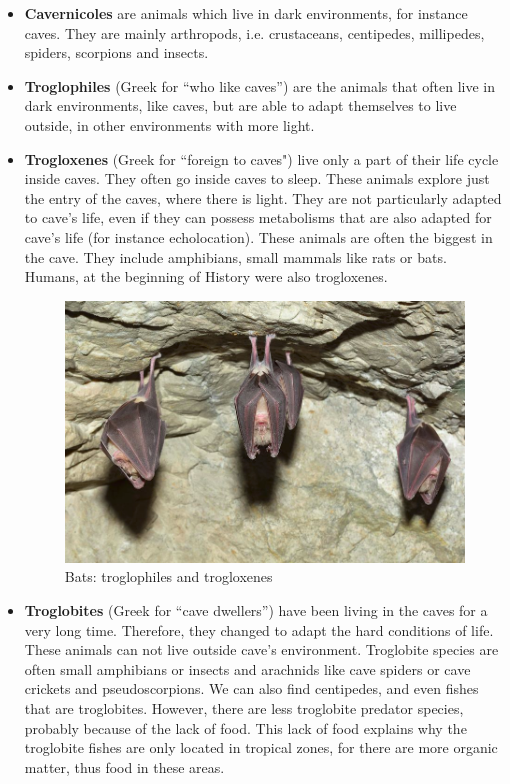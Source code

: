\documentclass[draft, final]{report}
\begin{document}
\begin{itemize}

\item \textbf{Cavernicoles} are animals which live in dark environments, for instance caves. They are mainly arthropods, i.e. crustaceans, centipedes, millipedes, spiders, scorpions and insects.

\item \textbf{Troglophiles} (Greek for “who like caves”) are the animals that often live in dark environments, like caves, but are able to adapt themselves to live outside, in other environments with more light.

\item \textbf{Trogloxenes} (Greek for “foreign to caves") live only a part of their life cycle inside caves. They often go inside caves to sleep. These animals explore just the entry of the caves, where there is light. They are not particularly adapted to cave’s life, even if they can possess metabolisms that are also adapted for cave’s life (for instance echolocation). These animals are often the biggest in the cave. They include amphibians, small mammals like rats or bats. Humans, at the beginning of History were also trogloxenes.

\begin{figure}[H]
  \centering
  \includegraphics[scale=0.35]{LateX/Images/bats.png}
  \caption{Bats: troglophiles and trogloxenes \cite{batspresentation}}
\end{figure}

\item \textbf{Troglobites} (Greek for “cave dwellers”) have been living in the caves for a very long time. Therefore, they changed to adapt the hard conditions of life. These animals can not live outside cave’s environment. Troglobite species are often small amphibians or insects and arachnids like cave spiders or cave crickets and pseudoscorpions. We can also find centipedes, and even fishes that are troglobites. However, there are less troglobite predator species, probably because of the lack of food. This lack of food explains why the troglobite fishes are only located in tropical zones, for there are more organic matter, thus food in these areas.
\end{itemize}
\end{document}
